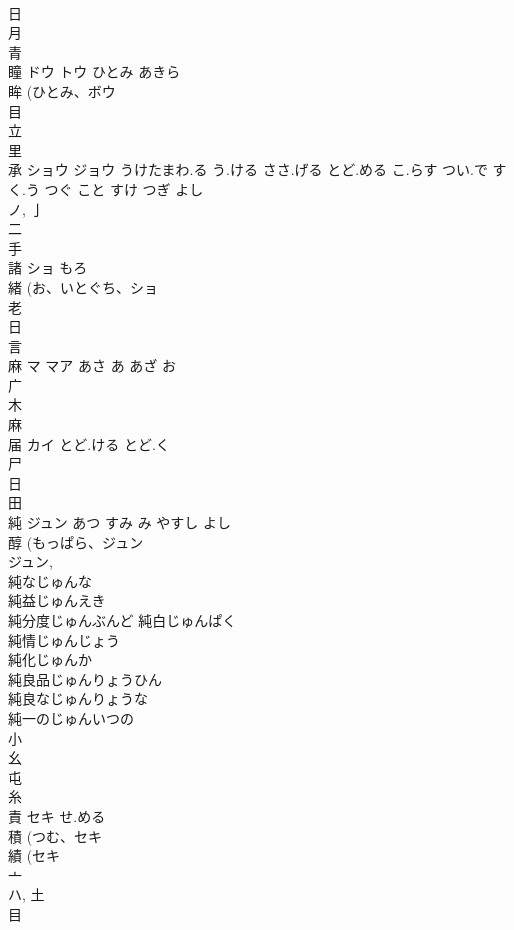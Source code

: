 \documentclass[8pt]{extreport}
\begin{document}
\begin{CJK}{UTF8}{min}
\\	日 
\\	月 
\\	青 
\\	瞳	ドウ トウ	ひとみ あきら	
\\	眸 (ひとみ、ボウ 
\\	目 
\\	立 
\\	里 
\\	承	ショウ ジョウ	うけたまわ.る う.ける ささ.げる とど.める こ.らす つい.で すく.う つぐ こと すけ つぎ よし	
\\	ノ, 亅 
\\	二 
\\	手 
\\	諸	ショ	もろ	
\\	緒 (お、いとぐち、ショ 
\\	老 
\\	日 
\\	言 
\\	麻	マ マア	あさ あ あざ お	
\\	广 
\\	木 
\\	麻 
\\	届	カイ	とど.ける とど.く	
\\	尸 
\\	日 
\\	田 
\\	純	ジュン	あつ すみ み やすし よし	
\\	醇 (もっぱら、ジュン 
\\	ジュン, 
\\	純なじゅんな 
\\	純益じゅんえき 
\\	純分度じゅんぶんど 純白じゅんぱく 
\\	純情じゅんじょう 
\\	純化じゅんか 
\\	純良品じゅんりょうひん 
\\	純良なじゅんりょうな 
\\	純一のじゅんいつの 
\\	小 
\\	幺 
\\	屯 
\\	糸 
\\	責	セキ	せ.める	
\\	積 (つむ、セキ 
\\	績 (セキ 
\\	亠 
\\	ハ, 土 
\\	目 

\end{CJK}
\end{document}
